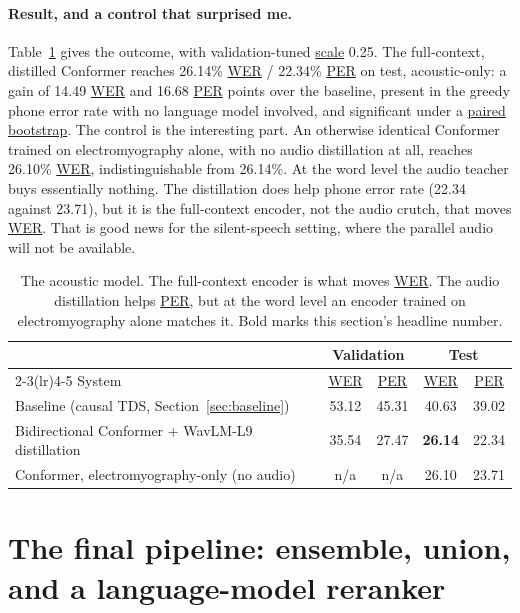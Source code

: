 \documentclass{article}
\DeclareRobustCommand{\glref}[2]{\hyperlink{gl:#1}{\textcolor{glosslink}{#2}}}
\DeclareRobustCommand{\wer}{\glref{wer}{WER}}
\DeclareRobustCommand{\per}{\glref{per}{PER}}
\begin{document}
\paragraph{Result, and a control that surprised me.}
Table~\ref{tab:acoustic} gives the outcome, with validation-tuned \glref{scale}{scale} 0.25. The
full-context, distilled Conformer reaches 26.14\% \wer{} / 22.34\% \per{} on test, acoustic-only: a
gain of 14.49 \wer{} and 16.68 \per{} points over the baseline, present in the greedy phone error rate
with no language model involved, and significant under a \glref{bootstrap}{paired bootstrap}. The
control is the interesting part. An otherwise identical Conformer trained on electromyography alone,
with no audio distillation at all, reaches 26.10\% \wer{}, indistinguishable from 26.14\%. At the word
level the audio teacher buys essentially nothing. The distillation does help phone error rate (22.34
against 23.71), but it is the full-context encoder, not the audio crutch, that moves \wer{}. That is
good news for the silent-speech setting, where the parallel audio will not be available.

\begin{table}[t]
\centering
\small
\caption{The acoustic model. The full-context encoder is what moves \wer{}. The audio distillation
helps \per{}, but at the word level an encoder trained on electromyography alone matches it. Bold
marks this section's headline number.}
\label{tab:acoustic}
\begin{tabular}{@{}l cc cc@{}}
\toprule
 & \multicolumn{2}{c}{Validation} & \multicolumn{2}{c}{Test} \\
\cmidrule(lr){2-3}\cmidrule(lr){4-5}
System & \wer{} & \per{} & \wer{} & \per{} \\
\midrule
Baseline (causal TDS, Section~\ref{sec:baseline}) & 53.12 & 45.31 & 40.63 & 39.02 \\
Bidirectional Conformer + WavLM-L9 distillation & 35.54 & 27.47 & \textbf{26.14} & 22.34 \\
Conformer, electromyography-only (no audio) & n/a & n/a & 26.10 & 23.71 \\
\bottomrule
\end{tabular}
\end{table}

\section{The final pipeline: ensemble, union, and a language-model reranker}
\label{sec:final}
\end{document}
